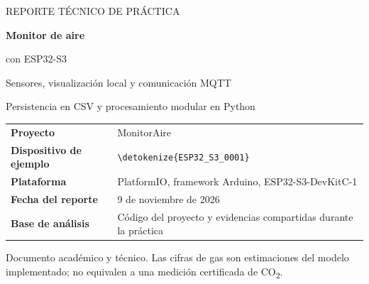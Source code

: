 \documentclass[11pt,a4paper]{article}
\newcommand{\code}[1]{\expandafter\nolinkurl\expandafter{\detokenize{#1}}}
\begin{document}
\begin{titlepage}
\thispagestyle{empty}
\vspace*{13mm}
{\color{teal}\large REPORTE TÉCNICO DE PRÁCTICA}\par
\vspace{8mm}
{\color{navy}\fontsize{32}{37}\selectfont\bfseries Monitor de aire\par con ESP32-S3}\par
\vspace{6mm}
{\Large Sensores, visualización local y comunicación MQTT}\par
\vspace{8mm}
{\large Persistencia en CSV y procesamiento modular en Python}\par
\vspace{14mm}
\vfill
\begin{tabularx}{\linewidth}{@{}lY@{}}
\textbf{Proyecto} & MonitorAire \\
\textbf{Dispositivo de ejemplo} & \code{ESP32_S3_0001} \\
\textbf{Plataforma} & PlatformIO, framework Arduino, ESP32-S3-DevKitC-1 \\
\textbf{Fecha del reporte} & 9 de noviembre de 2026 \\
\textbf{Base de análisis} & Código del proyecto y evidencias compartidas durante la práctica \\
\end{tabularx}
\vspace{7mm}
{\color{muted}\small Documento académico y técnico. Las cifras de gas son estimaciones del modelo implementado; no equivalen a una medición certificada de CO\textsubscript{2}.}
\end{titlepage}
\end{document}
